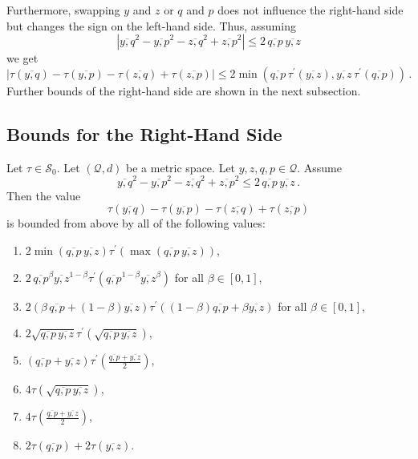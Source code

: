 \documentclass{article}
\newcommand{\lb}{\left(} %
\newcommand{\rb}{\right)} %
\newcommand{\br}[1]{\lb #1 \rb} %
\newcommand{\brOf}[1]{\!\br{#1}} %
\newcommand{\abs}[1]{\left| #1 \right|} %
\newcommand*{\mc}[1]{\mathcal{#1}}
\newcommand{\pr}{^\prime}
\newcommand{\equationFullstop}{\, .}
\newcommand{\eqfs}{\equationFullstop}
\newcommand{\ol}[2]{\overline{#1,#2}}
\newcommand{\tran}{\tau}
\newcommand{\dtran}{\tran\pr}
\newcommand{\setcco}{\mc S_0}
\begin{document}
Furthermore, swapping $y$ and $z$ or $q$ and $p$ does not influence the right-hand side but changes the sign on the left-hand side. Thus, assuming
\begin{equation}
	\abs{\ol yq^2 - \ol yp^2 - \ol zq^2 + \ol zp^2} \leq 2\, \ol qp \, \ol yz
\end{equation}
we get
\begin{equation}
	\abs{\tran(\ol yq) - \tran(\ol yp) - \tran(\ol zq) + \tran(\ol zp)} \leq 2 \min(\ol qp\,\dtran(\ol yz), \ol yz\, \dtran(\ol qp))
	\eqfs
\end{equation}
Further bounds of the right-hand side are shown in the next subsection.
%
%
%
\subsection{Bounds for the Right-Hand Side}
%
\begin{corollary}\label{cor:rhsbound}
	Let $\tran\in\setcco$. Let $(\mc Q, d)$ be a metric space. Let $y,z,q,p\in\mc Q$. Assume
	\begin{equation}
		\ol yq^2 - \ol yp^2 - \ol zq^2 + \ol zp^2 \leq 2\, \ol qp \, \ol yz
		\eqfs
	\end{equation}
	Then the value 
	\begin{equation}
		\tran(\ol yq) - \tran(\ol yp) - \tran(\ol zq) + \tran(\ol zp)
	\end{equation}
	is bounded from above by all of the following values:
	\begin{enumerate}[label=(\roman*)]
		\item\label{cor:rhsbound:min} $2 \min(\ol qp\, \ol yz) \dtran\brOf{\max(\ol qp\, \ol yz)}$,
		\item\label{cor:rhsbound:geo} $2 \,\ol qp^\beta \ol yz^{1-\beta} \dtran\brOf{\ol qp^{1-\beta} \ol yz^\beta}$ for all $\beta\in[0,1]$,
		\item\label{cor:rhsbound:ari} $2 \br{\beta\,\ol qp + (1-\beta)\ol yz} \dtran\brOf{(1-\beta)\ol qp + \beta\ol yz}$ for all $\beta\in[0,1]$,
		\item\label{cor:rhsbound:sqrt} $2 \sqrt{\ol qp\, \ol yz} \dtran\brOf{\sqrt{\ol qp\, \ol yz}}$,
		\item\label{cor:rhsbound:avg} $\br{\ol qp + \ol yz} \dtran\brOf{\frac{\ol qp + \ol yz}2}$,
		\item\label{cor:rhsbound:tran} $4\tran\brOf{\sqrt{\ol qp\, \ol yz}}$,
		\item\label{cor:rhsbound:sum} $4\tran\brOf{\frac{\ol qp + \ol yz}2}$,
		\item\label{cor:rhsbound:transum} $2\tran(\ol qp) + 2\tran(\ol yz)$.
	\end{enumerate}
\end{corollary}
\end{document}
